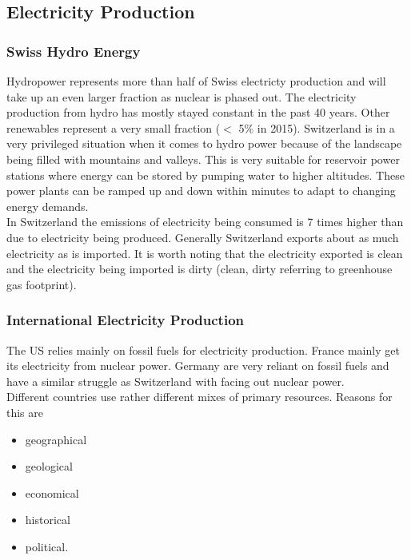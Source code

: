 \subsection{Electricity Production}

\subsubsection{Swiss Hydro Energy}
Hydropower represents more than half of Swiss electricty production and will take up an even larger fraction as nuclear is phased out.
The electricity production from hydro has mostly stayed constant in the past 40 years.
Other renewables represent a very small fraction ($<$ 5\% in 2015).
Switzerland is in a very privileged situation when it comes to hydro power because of the landscape being filled with mountains and valleys.
This is very suitable for reservoir power stations where energy can be stored by pumping water to higher altitudes.
These power plants can be ramped up and down within minutes to adapt to changing energy demands.\\

In Switzerland the \cotwo emissions of electricity being consumed is 7 times higher than due to electricity being produced.
Generally Switzerland exports about as much electricity as is imported. It is worth noting that the electricity exported is clean and the electricity being imported is dirty (clean, dirty referring to greenhouse gas footprint).

\subsubsection{International Electricity Production}
The US relies mainly on fossil fuels for electricity production.
France mainly get its electricity from nuclear power.
Germany are very reliant on fossil fuels and have a similar struggle as Switzerland with facing out nuclear power.\\

Different countries use rather different mixes of primary resources.
Reasons for this are

\begin{itemize}
    \item geographical
    \item geological
    \item economical
    \item historical
    \item political.
\end{itemize}

